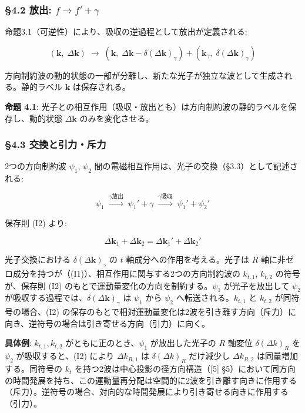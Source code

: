 \documentclass[
  a4paper,11pt]{ltjsarticle}
\theoremstyle{definition}
\theoremstyle{remark}
\begin{document}
\subsubsection{\texorpdfstring{§4.2 放出:
\(f \to f' + \gamma\)}{§4.2 放出: f \textbackslash to f\textquotesingle{} + \textbackslash gamma}}\label{ux653eux51fa-f-to-f-gamma}

命題3.1（可逆性）により、吸収の逆過程として放出が定義される:

\[(\mathbf{k},\; \Delta\mathbf{k}) \;\longrightarrow\; (\mathbf{k},\; \Delta\mathbf{k} - \delta(\Delta\mathbf{k})_\gamma) + (\mathbf{k}_\gamma,\; \delta(\Delta\mathbf{k})_\gamma)\]

方向制約波の動的状態の一部が分離し、新たな光子が独立な波として生成される。静的ラベル
\(\mathbf{k}\) は保存される。

\textbf{命題 4.1}:
光子との相互作用（吸収・放出とも）は方向制約波の静的ラベルを保存し、動的状態
\(\Delta\mathbf{k}\) のみを変化させる。

\subsubsection{§4.3
交換と引力・斥力}\label{ux4ea4ux63dbux3068ux5f15ux529bux65a5ux529b}

2つの方向制約波 \(\psi_1\), \(\psi_2\)
間の電磁相互作用は、光子の交換（§3.3）として記述される:

\[\psi_1 \;\xrightarrow{\gamma\text{放出}}\; \psi_1' + \gamma \;\xrightarrow{\gamma\text{吸収}}\; \psi_1' + \psi_2'\]

保存則 (I2) より:

\[\Delta\mathbf{k}_1 + \Delta\mathbf{k}_2 = \Delta\mathbf{k}_1' + \Delta\mathbf{k}_2'\]

光子交換における \(\delta(\Delta\mathbf{k})_\gamma\) の \(t\)
軸成分への作用を考える。光子は \(R\)
軸に非ゼロ成分を持つが（(I1)）、相互作用に関与する2つの方向制約波の
\(k_{t,1}\), \(k_{t,2}\) の符号が、保存則 (I2)
のもとで運動量変化の方向を制約する。\(\psi_1\) が光子を放出して
\(\psi_2\) が吸収する過程では、\(\delta(\Delta\mathbf{k})_\gamma\) は
\(\psi_1\) から \(\psi_2\) へ転送される。\(k_{t,1}\) と \(k_{t,2}\)
が同符号の場合、(I2)
の保存のもとで相対運動量変化は2波を引き離す方向（斥力）に向き、逆符号の場合は引き寄せる方向（引力）に向く。

\textbf{具体例}: \(k_{t,1}, k_{t,2}\) がともに正のとき、\(\psi_1\)
が放出した光子の \(R\) 軸変位 \(\delta(\Delta k)_R\) を \(\psi_2\)
が吸収すると、(I2) により \(\Delta k_{R,1}\) は \(\delta(\Delta k)_R\)
だけ減少し \(\Delta k_{R,2}\) は同量増加する。同符号の \(k_t\)
を持つ2波は中心投影の径方向構造（{[}5{]}
§5）において同方向の時間発展を持ち、この運動量再分配は空間的に2波を引き離す向きに作用する（斥力）。逆符号の場合、対向的な時間発展により引き寄せる向きに作用する（引力）。
\end{document}
